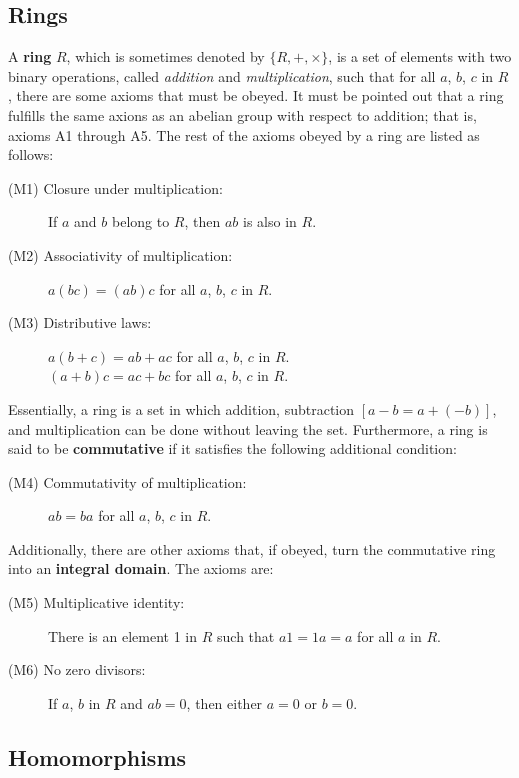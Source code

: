 \subsection{Rings}

A \textbf{ring} $R$, which is sometimes denoted by $\{R, +, \times \}$, is a set of elements with two binary operations, called \textit{addition} and \textit{multiplication}, such that for all $a$, $b$, $c$ in $R$, there are some axioms that must be obeyed. It must be pointed out that a ring fulfills the same axions as an abelian group with respect to addition; that is, axioms A1 through A5. The rest of the axioms obeyed by a ring are listed as follows:
\begin{description}
\item[(M1) Closure under multiplication:] If $a$ and $b$ belong to $R$, then $ab$ is also in $R$.
\item[(M2) Associativity of multiplication:] $a(bc) = (ab)c$ for all $a$, $b$, $c$ in $R$.
\item[(M3) Distributive laws:] $a(b+c) = ab+ ac$ for all $a$, $b$, $c$ in $R$. \\ $(a+b)c = ac + bc$ for all $a$, $b$, $c$ in $R$.
\end{description}

Essentially, a ring is a set in which addition, subtraction $[a-b = a + (-b)]$, and multiplication can be done without leaving the set. Furthermore, a ring is said to be \textbf{commutative} if it satisfies the following additional condition:
\begin{description}
\item[(M4) Commutativity of multiplication:] $ab = ba$ for all $a$, $b$, $c$ in $R$.
\end{description}

Additionally, there are other axioms that, if obeyed, turn the commutative ring into an \textbf{integral domain}. The axioms are:  

\begin{description}
\item[(M5) Multiplicative identity:] There is an element 1 in $R$ such that $a1 = 1a = a$ for all $a$ in $R$.
\item[(M6) No zero divisors:] If $a$, $b$ in $R$ and $ab=0$, then either $a=0$ or $b=0$.
\end{description}

\subsection{Homomorphisms}


